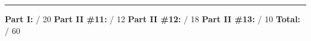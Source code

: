 \documentclass[10pt]{article}
\begin{document}
\vspace{0.2in}
\noindent\rule{\linewidth}{0.4pt}
\begin{center}
  \textbf{Part I:} \underline{\hspace{0.8in}} / 20 \quad
  \textbf{Part II \#11:} \underline{\hspace{0.8in}} / 12 \quad
  \textbf{Part II \#12:} \underline{\hspace{0.8in}} / 18 \quad
  \textbf{Part II \#13:} \underline{\hspace{0.8in}} / 10 \quad
  \textbf{Total:} \underline{\hspace{0.8in}} / 60
\end{center}
\end{document}
